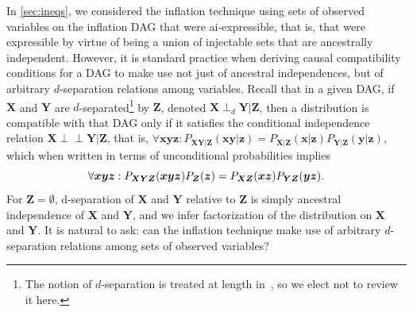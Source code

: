 \documentclass[aps,english,10pt,superscriptaddress,onecolumn,twoside,longbibliography,pra,floatfix,fleqn,nofootinbib]{revtex4-1}%
\theoremstyle{definition}
\newcommand{\p}[2][]{{P_{#1}}\parenths{#2}}
\newcommand{\indep}{\perp\!\!\!\!\perp} %
\DeclarePairedDelimiter{\parenths}{\lparen}{\rparen}
\begin{document}
\color{blue} In \cref{sec:ineqs}, we considered the inflation technique using sets of observed variables on the inflation DAG that were 
ai-expressible, that is, that were
expressible by virtue of being a union of injectable sets that are ancestrally independent.
\color{black}
However, it is standard practice when deriving causal compatibility conditions for a DAG to make use not just of ancestral independences, but of arbitrary $d$-separation relations among variables.  Recall that in a given DAG, if $\bm{X}$ and $\bm{Y}$ are $d$-separated\footnote{The notion of $d$-separation is treated at length in~\cite{pearl2009causality,studeny2005probabilistic,WoodSpekkens,pusey2014gdag}, so we elect not to review it here.} by $\bm{Z}$, denoted  $\bm{X}\perp_d \bm{Y}|\bm{Z}$, then a distribution is compatible with that DAG only if it satisfies the conditional independence relation $\bm{X}\indep\bm{Y}|\bm{Z}$, that is,
 $\forall{\bm{x} \bm{y} \bm{z}}: P_{\bm{X}\bm{Y}|\bm{Z}}(\bm{x}\bm{y}|\bm{z})=P_{\bm{X}|\bm{Z}}(\bm{x}|\bm{z})P_{\bm{Y}|\bm{Z}}(\bm{y}|\bm{z})$,
which when written in terms of unconditional probabilities implies
\begin{equation}\label{CIuncondprobs}
\forall{\bm{x} \bm{y} \bm{z}}: \p[\bm{X}\bm{Y}\bm{Z}]{\bm{x}\bm{y}\bm{z}}\p[\bm{Z}]{\bm{z}}=\p[\bm{X}\bm{Z}]{\bm{x}\bm{z}}\p[\bm{Y}\bm{Z}]{\bm{y}\bm{z}}.
\end{equation}
For $\bm{Z} = \emptyset$, d-separation of $\bm{X}$ and $\bm{Y}$ relative to $\bm{Z}$ is simply ancestral independence of $\bm{X}$ and $\bm{Y}$, and we infer factorization of the distribution on $\bm{X}$ and $\bm{Y}$. It is natural to ask: can the inflation technique make use of arbitrary $d$-separation relations among sets of observed variables? 
\end{document}
